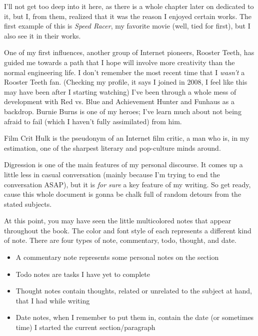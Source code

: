 \documentclass[./butidigress.tex]{subfiles}
\begin{document}
I'll not get too deep into it here, as there is a whole chapter later on dedicated to it, but I, from them, realized that it was the reason I enjoyed certain works.
The first example of this is \textit{Speed Racer}, my favorite movie (well, tied for first), but I also see it in their works.

One of my first influences, another group of Internet pioneers, Rooster Teeth, has guided me towards a path that I hope will involve more creativity than the normal engineering life.
I don't remember the most recent time that I \emph{wasn't} a Rooster Teeth fan.
(Checking my profile, it says I joined in 2008, I feel like this may have been after I starting watching)
I've been through a whole mess of development with Red vs. Blue and Achievement Hunter and Funhaus as a backdrop.
Burnie Burns is one of my heroes; I've learn much about not being afraid to fail (which I haven't fully assimilated) from him.

Film Crit Hulk is the pseudonym of an Internet film critic, a man who is, in my estimation, one of the sharpest literary and pop-culture minds around.

\label{sec:thetitle}
Digression is one of the main features of my personal discourse.
It comes up a little less in casual conversation (mainly because I'm trying to end the conversation ASAP), but it is \emph{for sure} a key feature of my writing.
So get ready, cause this whole document is gonna be chalk full of random detours from the stated subjects.

At this point, you may have seen the little multicolored notes that appear throughout the book.
The color and font style of each represents a different kind of note.
There are four types of note, commentary, todo, thought, and date.

\begin{itemize}
    \item {\commstyle\textcolor{\commcolor}{A commentary note represents some personal notes on the section}}
    \item {\todostyle\textcolor{\todocolor}{Todo notes are tasks I have yet to complete}}
    \item {\thoughtstyle\textcolor{\thoughtcolor}{Thought notes contain thoughts, related or unrelated to the subject at hand, that I had while writing}}
    \item {\datestyle\textcolor{\datecolor}{Date notes, when I remember to put them in, contain the date (or sometimes time) I started the current section/paragraph}}
\end{itemize}
\end{document}
